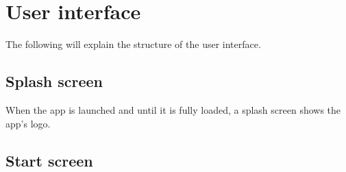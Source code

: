 \section{User interface}

The following will explain the structure of the user interface. 

\subsection{Splash screen}

\begin{minipage}{0.45\textwidth}
When the app is launched and until it is fully loaded, a splash screen shows the app's logo.
\end{minipage} \hfill
\begin{minipage}{0.5\textwidth}
\end{minipage}

\subsection{Start screen}

